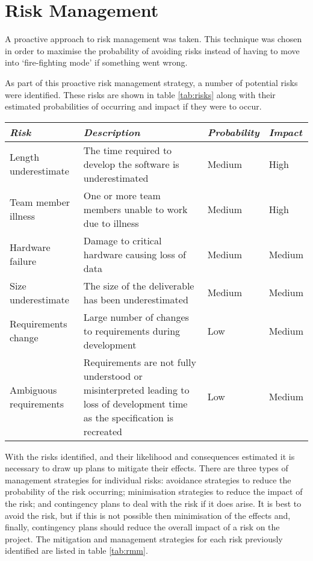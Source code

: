 \section{Risk Management}
\label{section:risk}

A proactive approach to risk management was taken. This technique was chosen in order
to maximise the probability of avoiding risks instead of having to move into `fire-fighting mode'
if something went wrong.

As part of this proactive risk management strategy, a number of potential risks were identified.
These risks are shown in table \ref{tab:risks} along with their estimated probabilities of occurring
and impact if they were to occur.

\begin{table*}
	\small
	\begin{tabular}{l p{} l l}
		\toprule
		\emph{Risk} & \emph{Description} & \emph{Probability} & \emph{Impact} \\
		\midrule
		Length underestimate & The time required to develop the software is underestimated & Medium & High \\
		Team member illness & One or more team members unable to work due to illness & Medium & High \\
		Hardware failure & Damage to critical hardware causing loss of data & Medium & Medium \\
		Size underestimate & The size of the deliverable has been underestimated & Medium & Medium \\
		Requirements change & Large number of changes to requirements during development & Low & Medium \\
		Ambiguous requirements & Requirements are not fully understood or misinterpreted leading to
			loss of development time as the specification is recreated & Low & Medium \\
		\bottomrule
	\end{tabular}
	\vspace{1.5em}
	\caption{Risk identification and analysis.}
	\label{tab:risks}
\end{table*}

With the risks identified, and their likelihood and consequences estimated it is necessary
to draw up plans to mitigate their effects. There are three types of management strategies 
for individual risks: avoidance strategies to reduce the probability of the risk occurring;
minimisation strategies to reduce the impact of the risk; and contingency plans to deal with
the risk if it does arise. It is best to avoid the risk,
but if this is not possible then minimisation of the effects and, finally, contingency plans
should reduce the overall impact of a risk on the project. The mitigation and management
strategies for each risk previously identified are listed in table \ref{tab:rmm}.

